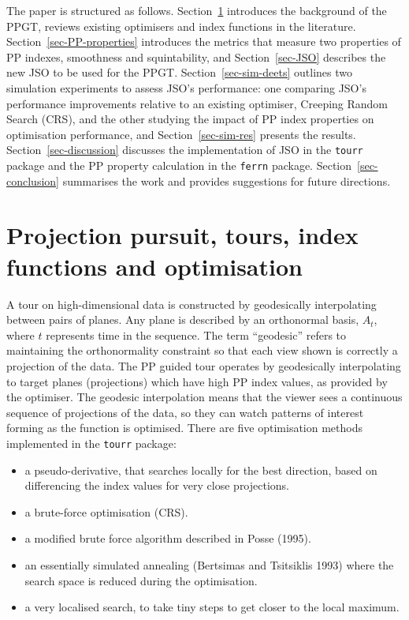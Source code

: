 \documentclass[
  12pt,
]{interact}
\providecommand{\tightlist}{%
  \setlength{\itemsep}{0pt}\setlength{\parskip}{0pt}}\usepackage{longtable,booktabs,array}
\theoremstyle{plain}
\begin{document}
The paper is structured as follows. Section~\ref{sec-background}
introduces the background of the PPGT, reviews existing optimisers and
index functions in the literature. Section~\ref{sec-PP-properties}
introduces the metrics that measure two properties of PP indexes,
smoothness and squintability, and Section~\ref{sec-JSO} describes the
new JSO to be used for the PPGT. Section~\ref{sec-sim-deets} outlines
two simulation experiments to assess JSO's performance: one comparing
JSO's performance improvements relative to an existing optimiser,
Creeping Random Search (CRS), and the other studying the impact of PP
index properties on optimisation performance, and
Section~\ref{sec-sim-res} presents the results.
Section~\ref{sec-discussion} discusses the implementation of JSO in the
\texttt{tourr} package and the PP property calculation in the
\texttt{ferrn} package. Section~\ref{sec-conclusion} summarises the work
and provides suggestions for future directions.

\hypertarget{sec-background}{%
\section{Projection pursuit, tours, index functions and
optimisation}\label{sec-background}}

A tour on high-dimensional data is constructed by geodesically
interpolating between pairs of planes. Any plane is described by an
orthonormal basis, \(A_t\), where \(t\) represents time in the sequence.
The term ``geodesic'' refers to maintaining the orthonormality
constraint so that each view shown is correctly a projection of the
data. The PP guided tour operates by geodesically interpolating to
target planes (projections) which have high PP index values, as provided
by the optimiser. The geodesic interpolation means that the viewer sees
a continuous sequence of projections of the data, so they can watch
patterns of interest forming as the function is optimised. There are
five optimisation methods implemented in the \texttt{tourr} package:

\begin{itemize}
\tightlist
\item
  a pseudo-derivative, that searches locally for the best direction,
  based on differencing the index values for very close projections.
\item
  a brute-force optimisation (CRS).
\item
  a modified brute force algorithm described in Posse (1995).
\item
  an essentially simulated annealing (Bertsimas and Tsitsiklis 1993)
  where the search space is reduced during the optimisation.
\item
  a very localised search, to take tiny steps to get closer to the local
  maximum.
\end{itemize}
\end{document}
